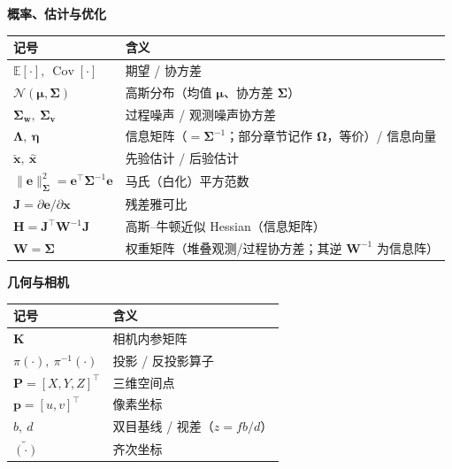 \begin{center}\small
\textbf{概率、估计与优化}\par\vspace{3pt}
\begin{tabular}{ll}
\toprule
记号 & 含义 \\
\midrule
$\mathbb{E}[\cdot],\ \operatorname{Cov}[\cdot]$ & 期望 / 协方差 \\
$\mathcal{N}(\boldsymbol{\mu},\boldsymbol{\Sigma})$ & 高斯分布（均值 $\boldsymbol{\mu}$、协方差 $\boldsymbol{\Sigma}$） \\
$\boldsymbol{\Sigma}_{\mathbf{w}},\ \boldsymbol{\Sigma}_{\mathbf{v}}$ & 过程噪声 / 观测噪声协方差 \\
$\boldsymbol{\Lambda},\ \boldsymbol{\eta}$ & 信息矩阵（$=\boldsymbol{\Sigma}^{-1}$；部分章节记作 $\boldsymbol{\Omega}$，等价）/ 信息向量 \\
$\check{\mathbf{x}},\ \hat{\mathbf{x}}$ & 先验估计 / 后验估计 \\
$\lVert\mathbf{e}\rVert_{\boldsymbol{\Sigma}}^2=\mathbf{e}^\top\boldsymbol{\Sigma}^{-1}\mathbf{e}$ & 马氏（白化）平方范数 \\
$\mathbf{J}=\partial\mathbf{e}/\partial\mathbf{x}$ & 残差雅可比 \\
$\mathbf{H}=\mathbf{J}^\top\mathbf{W}^{-1}\mathbf{J}$ & 高斯–牛顿近似 Hessian（信息矩阵） \\
$\mathbf{W}=\boldsymbol{\Sigma}$ & 权重矩阵（堆叠观测/过程协方差；其逆 $\mathbf{W}^{-1}$ 为信息阵） \\
\bottomrule
\end{tabular}
\end{center}

\begin{center}\small
\textbf{几何与相机}\par\vspace{3pt}
\begin{tabular}{ll}
\toprule
记号 & 含义 \\
\midrule
$\mathbf{K}$ & 相机内参矩阵 \\
$\pi(\cdot),\ \pi^{-1}(\cdot)$ & 投影 / 反投影算子 \\
$\mathbf{P}=[X,Y,Z]^\top$ & 三维空间点 \\
$\mathbf{p}=[u,v]^\top$ & 像素坐标 \\
$b,\ d$ & 双目基线 / 视差（$z=fb/d$） \\
$\tilde{(\cdot)}$ & 齐次坐标 \\
\bottomrule
\end{tabular}
\end{center}
